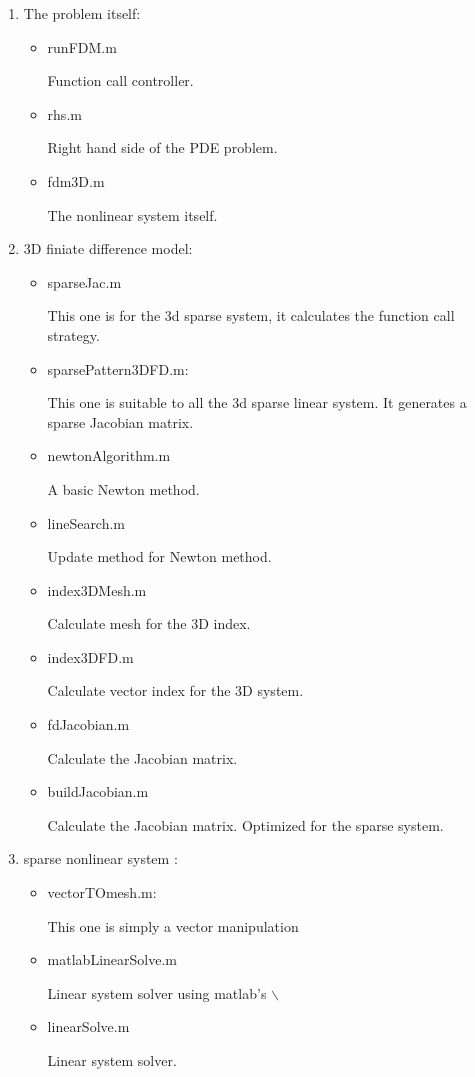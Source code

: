 \documentclass[11pt]{article}
\begin{document}
\begin{enumerate}
\item The problem itself:
\begin{itemize}
\item runFDM.m

Function call controller.
\item rhs.m

Right hand side of the PDE problem.

\item fdm3D.m

The nonlinear system itself.

\end{itemize}


\item 3D finiate difference model:

\begin{itemize}
\item sparseJac.m

This one is for the 3d sparse system, it calculates the function call strategy.
\item sparsePattern3DFD.m:

This one is suitable to all the 3d sparse linear system. It generates a sparse Jacobian matrix.
\item newtonAlgorithm.m

A basic Newton method.

\item lineSearch.m

Update method for Newton method.

\item index3DMesh.m

Calculate mesh for the 3D index.

\item index3DFD.m

Calculate vector index for the 3D system.

\item fdJacobian.m

Calculate the Jacobian matrix.

\item buildJacobian.m

Calculate the Jacobian matrix. Optimized for the sparse system. 
\end{itemize}



\item sparse nonlinear system :

\begin{itemize}
\item vectorTOmesh.m:

This one is simply a vector manipulation 
\item matlabLinearSolve.m

Linear system solver using matlab's $\backslash$

\item linearSolve.m

Linear system solver.


\end{itemize}

\end{enumerate}
\end{document}
